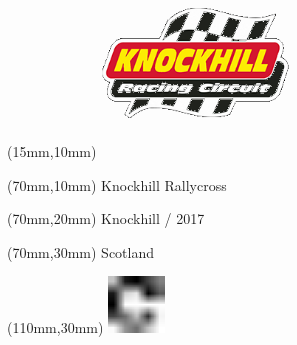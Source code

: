 \null\newpage
\begin{textblock*}{50mm}(15mm,10mm)%
\includegraphics[width=50mm]{LG/KNO.png}
\end{textblock*}
\begin{textblock*}{130mm}(70mm,10mm)%
{\fontsize{20}{20}\selectfont Knockhill Rallycross}\\
\end{textblock*}
\begin{textblock*}{120mm}(70mm,20mm)%
{\fontsize{16}{16}\selectfont Knockhill / 2017}\\
\end{textblock*}
\begin{textblock*}{120mm}(70mm,30mm)%
{\fontsize{12}{12}\selectfont Scotland}
\end{textblock*}
\begin{textblock*}{30mm}(110mm,30mm)%
\centering
\includegraphics[height=15mm]{icons/fa-rotate-right.pdf}
\end{textblock*}
